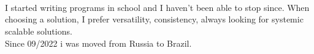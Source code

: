     \begin{minipage}[t]{0.275\textwidth} %
        \vspace{-\baselineskip} %

        \\
         \\
         \\
    \end{minipage}

    \vspace{0.5cm}



    \begin{minipage}[t]{0.4\textwidth} %
        \vspace{-\baselineskip} %

        I started writing programs in school and I haven't been able to stop since. When choosing a solution, I prefer versatility, consistency, always looking for systemic scalable solutions.\\Since 09/2022 i was moved from Russia to Brazil.
    \end{minipage}
    \hfill %
    \begin{minipage}[t]{0.5\textwidth} %


        \vspace{-\baselineskip} %
        \begin{barchart}{5.5}
        \end{barchart}
    \end{minipage}

